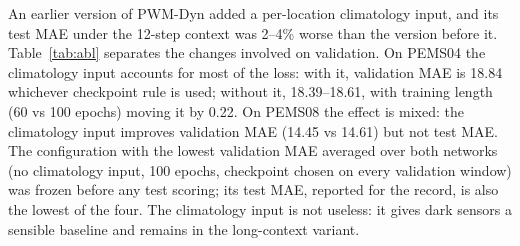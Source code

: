 An earlier version of PWM-Dyn added a per-location climatology input, and its test MAE under the 12-step context was
2--4\% worse than the version before it. Table~\ref{tab:abl} separates the changes involved on validation. On PEMS04
the climatology input accounts for most of the loss: with it, validation MAE is 18.84 whichever checkpoint rule is
used; without it, 18.39--18.61, with training length (60 vs 100 epochs) moving it by 0.22. On PEMS08 the effect is
mixed: the climatology input improves validation MAE (14.45 vs 14.61) but not test MAE. The configuration with the
lowest validation MAE averaged over both networks (no climatology input, 100 epochs, checkpoint chosen on every
validation window) was frozen before any test scoring; its test MAE, reported for the record, is also the lowest of
the four. The climatology input is not useless: it gives dark sensors a sensible baseline and remains in the
long-context variant.
